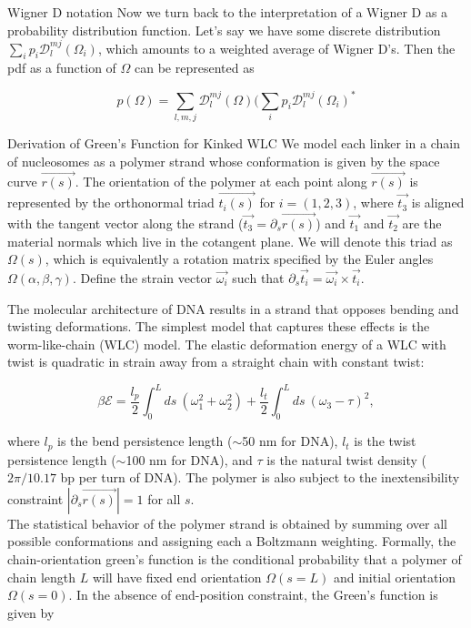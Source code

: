 \documentclass[11pt]{article}
\begin{document}
\begin{flushleft}
\begin{section}{Wigner D notation}
Now we turn back to the interpretation of a Wigner D as a probability distribution function. Let's say we have some discrete distribution $\sum_{i}p_i{\mathcal{D}}^{mj}_{l}(\Omega_i)$, which amounts to a weighted average of Wigner D's. Then the pdf as a function of $\Omega$ can be represented as

    \begin{equation*}
    p(\Omega) = \sum_{l,m,j}{\mathcal{D}}^{mj}_{l}(\Omega)(\sum_{i}p_i{\mathcal{D}}^{mj}_{l}(\Omega_i)^*
    \end{equation*}

\end{section}
\pagebreak

\begin{section}{Derivation of Green's Function for Kinked WLC}
We model each linker in a chain of nucleosomes as a polymer strand whose conformation is given by the space curve $\vec{r(s)}$. The orientation of the polymer at each point along $\vec{r(s)}$ is represented by the orthonormal triad $\vec{t_i(s)}$ for $i = (1, 2, 3)$, where $\vec{t_3}$ is aligned with the tangent vector along the strand ($\vec{t_3}=\partial_s\vec{r(s)}$) and $\vec{t_1}$ and $\vec{t_2}$ are the material normals which live in the cotangent plane. We will denote this triad as $\Omega(s)$, which is equivalently a rotation matrix specified by the Euler angles $\Omega(\alpha, \beta, \gamma)$. Define the strain vector $\vec{\omega_i}$ such that $\partial_s\vec{t_i} = \vec{\omega_i}\times\vec{t_i}$.

\vspace{\baselineskip}
The molecular architecture of DNA results in a strand that opposes bending and twisting deformations. The simplest model that captures these effects is the worm-like-chain (WLC) model. The elastic deformation energy of a WLC with twist is quadratic in strain away from a straight chain with constant twist:

\begin{equation}\label{eq1}
  \beta \mathcal{E} = \frac{l_p}{2}\int_{0}^{L}ds~(\omega_1^2 + \omega_2^2)+\frac{l_t}{2}\int_{0}^{L}ds~(\omega_3- \tau)^2,
\end{equation}

where $l_p$ is the bend persistence length ($\sim$50 nm for DNA), $l_t$ is the twist persistence length ($\sim$100 nm for DNA), and $\tau$ is the natural twist density ($2\pi/10.17$ bp per turn of DNA). The polymer is also subject to the inextensibility constraint $|\partial_s\vec{r(s)}|=1$ for all $s$.\\
\vspace{\baselineskip}
The statistical behavior of the polymer strand is obtained by summing over all possible conformations and assigning each a Boltzmann weighting. Formally, the chain-orientation green's function is the conditional probability that a polymer of chain length $L$ will have fixed end orientation $\Omega(s=L)$ and initial orientation $\Omega(s=0)$. In the absence of end-position constraint, the Green's function is given by


\end{section}
\end{flushleft}
\end{document}
